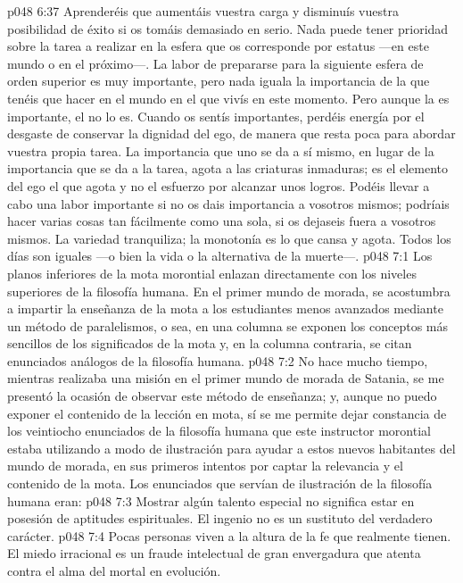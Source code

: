 \vs p048 6:37 Aprenderéis que aumentáis vuestra carga y disminuís vuestra posibilidad de éxito si os tomáis demasiado en serio. Nada puede tener prioridad sobre la tarea a realizar en la esfera que os corresponde por estatus ---en este mundo o en el próximo---. La labor de prepararse para la siguiente esfera de orden superior es muy importante, pero nada iguala la importancia de la que tenéis que hacer en el mundo en el que vivís en este momento. Pero aunque la  es importante, el  no lo es. Cuando os sentís importantes, perdéis energía por el desgaste de conservar la dignidad del ego, de manera que resta poca para abordar vuestra propia tarea. La importancia que uno se da a sí mismo, en lugar de la importancia que se da a la tarea, agota a las criaturas inmaduras; es el elemento del ego el que agota y no el esfuerzo por alcanzar unos logros. Podéis llevar a cabo una labor importante si no os dais importancia a vosotros mismos; podríais hacer varias cosas tan fácilmente como una sola, si os dejaseis fuera a vosotros mismos. La variedad tranquiliza; la monotonía es lo que cansa y agota. Todos los días son iguales ---o bien la vida o la alternativa de la muerte---.
\vs p048 7:1 Los planos inferiores de la mota morontial enlazan directamente con los niveles superiores de la filosofía humana. En el primer mundo de morada, se acostumbra a impartir la enseñanza de la mota a los estudiantes menos avanzados mediante un método de paralelismos, o sea, en una columna se exponen los conceptos más sencillos de los significados de la mota y, en la columna contraria, se citan enunciados análogos de la filosofía humana.
\vs p048 7:2 No hace mucho tiempo, mientras realizaba una misión en el primer mundo de morada de Satania, se me presentó la ocasión de observar este método de enseñanza; y, aunque no puedo exponer el contenido de la lección en mota, sí se me permite dejar constancia de los veintiocho enunciados de la filosofía humana que este instructor morontial estaba utilizando a modo de ilustración para ayudar a estos nuevos habitantes del mundo de morada, en sus primeros intentos por captar la relevancia y el contenido de la mota. Los enunciados que servían de ilustración de la filosofía humana eran:
\vs p048 7:3 Mostrar algún talento especial no significa estar en posesión de aptitudes espirituales. El ingenio no es un sustituto del verdadero carácter.
\vs p048 7:4 Pocas personas viven a la altura de la fe que realmente tienen. El miedo irracional es un fraude intelectual de gran envergadura que atenta contra el alma del mortal en evolución.
